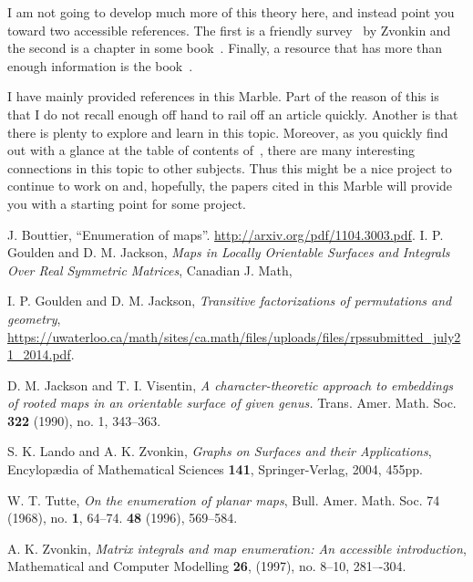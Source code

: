 \documentclass{axolotl}
\begin{document}
I am not going to develop much more of this theory here, and instead point
you toward two accessible references. The first is a friendly survey~\cite{Zv} by Zvonkin
and the second is a chapter in some book~\cite{Bo}. Finally, a resource that has
more than enough information is the book~\cite{LZ}.

I have mainly provided references in this Marble. Part of the reason of this is
that I do not recall enough off hand to rail off an article quickly. Another is
that there is plenty to explore and learn in this topic. Moreover, as you
quickly find out with a glance at the table of contents of~\cite{LZ}, there are
many interesting connections in this topic to other subjects. Thus this might
be a nice project to continue to work on and, hopefully, the papers cited in
this Marble will provide you with a starting point for some project.

\begin{thebibliography}{9}
    J. Bouttier,
    ``Enumeration of maps''.
    \url{http://arxiv.org/pdf/1104.3003.pdf}.
    I. P. Goulden and D. M. Jackson,
    \emph{Maps in Locally Orientable Surfaces and Integrals Over Real Symmetric Matrices},
    Canadian J. Math,

    I. P. Goulden and D. M. Jackson,
    \emph{Transitive factorizations of permutations and geometry},
    \url{https://uwaterloo.ca/math/sites/ca.math/files/uploads/files/rpssubmitted_july21_2014.pdf}.

    D. M. Jackson and T. I. Visentin,
    \emph{A character-theoretic approach to embeddings of rooted maps in an orientable surface of given genus.}
    Trans. Amer. Math. Soc.
    \textbf{322} (1990), no. 1, 343--363.

    S. K. Lando and A. K. Zvonkin,
    \emph{Graphs on Surfaces and their Applications},
    Encylop\ae dia of Mathematical Sciences \textbf{141},
    Springer-Verlag, 2004, 455pp.

    W. T. Tutte,
    \emph{On the enumeration of planar maps},
    Bull. Amer. Math. Soc. 74 (1968),
    no. \textbf{1}, 64--74.
    \textbf{48} (1996), 569--584.

    A. K. Zvonkin,
    \emph{Matrix integrals and map enumeration: An accessible introduction},
    Mathematical and Computer Modelling
    \textbf{26}, (1997),
    no. 8–10, 281–-304.
\end{thebibliography}
\end{document}
